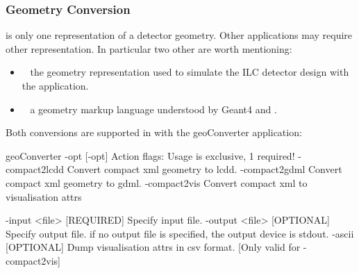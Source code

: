 \documentclass[10pt,a4paper]{article}
\begin{document}
\subsubsection{Geometry Conversion}
\label{sec:dd4hep-manual-geometry-conversion}
\noindent
{}  is only one representation of a detector geometry.
Other applications may require other representation. In particular two other
are worth mentioning:
\begin{itemize}\itemcompact
\item {}~\cite{bib:LCDD} the geometry representation used to 
    simulate the ILC detector design with the  application.
\item {}~\cite{bib:GDML} a geometry markup language understood
    by Geant4 and .
\end{itemize}
Both conversions are supported in \DDhep with the geoConverter application:
\begin{code}
  geoConverter -opt [-opt]                                                
        Action flags:               Usage is exclusive, 1 required!           
        -compact2lcdd               Convert compact xml geometry to lcdd.     
        -compact2gdml               Convert compact xml geometry to gdml.     
        -compact2vis                Convert compact xml to visualisation attrs

        -input  <file>  [REQUIRED]  Specify input file.                       
        -output <file>  [OPTIONAL]  Specify output file.                      
                                    if no output file is specified, the output
                                    device is stdout.                         
        -ascii          [OPTIONAL]  Dump visualisation attrs in csv format.   
                                    [Only valid for -compact2vis]             
\end{code}

\end{document}
